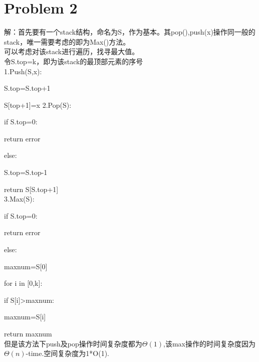 \documentclass[12pt,a4paper]{article}
\begin{document}
    \section{Problem 2}
    解：首先要有一个stack结构，命名为S，作为基本。其pop(),push(x)操作同一般的stack，唯一需要考虑的即为Max()方法。\\
    可以考虑对该stack进行遍历，找寻最大值。\\
    令S.top=k，即为该stack的最顶部元素的序号\\
    1.Push(S,x):
    \par\setlength\parindent{2em}S.top=S.top+1
    \par\setlength\parindent{2em}S[top+1]=x
    2.Pop(S):
    \par\setlength\parindent{2em}if S.top=0:
    \par\setlength\parindent{4em}return error
    \par\setlength\parindent{2em}else:
    \par\setlength\parindent{4em}S.top=S.top-1
    \par\setlength\parindent{4em}return S[S.top+1]\\
    3.Max(S):
    \par\setlength\parindent{2em}if S.top=0:
    \par\setlength\parindent{4em}return error
    \par\setlength\parindent{2em}else:
    \par\setlength\parindent{4em}maxnum=S[0]
    \par\setlength\parindent{4em}for i in [0,k]:
    \par\setlength\parindent{4em}if S[i]>maxnum:
    \par\setlength\parindent{6em}maxnum=S[i]
    \par\setlength\parindent{4em}return maxnum\\
    但是该方法下push及pop操作时间复杂度都为$\Theta(1)$,该max操作的时间复杂度因为$\Theta(n)$-time.空间复杂度为1*O(1).
\end{document}
